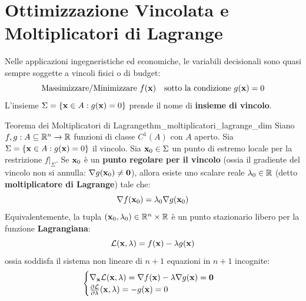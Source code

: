 \section{Ottimizzazione Vincolata e Moltiplicatori di Lagrange}

Nelle applicazioni ingegneristiche ed economiche, le variabili decisionali sono quasi sempre soggette a vincoli fisici o di budget:
\[
\text{Massimizzare/Minimizzare } f(\mathbf{x}) \quad \text{sotto la condizione } g(\mathbf{x}) = 0
\]
L'insieme $\Sigma = \{\mathbf{x} \in A : g(\mathbf{x}) = 0\}$ prende il nome di \textbf{insieme di vincolo}.

\begin{teorema}{Teorema dei Moltiplicatori di Lagrange}{thm_moltiplicatori_lagrange_dim}
Siano $f, g: A \subseteq \mathbb{R}^n \to \mathbb{R}$ funzioni di classe $C^1(A)$ con $A$ aperto. Sia $\Sigma = \{\mathbf{x} \in A : g(\mathbf{x}) = 0\}$ il vincolo.
Sia $\mathbf{x}_0 \in \Sigma$ un punto di estremo locale per la restrizione $\left.f\right|_\Sigma$.
Se $\mathbf{x}_0$ è un \textbf{punto regolare per il vincolo} (ossia il gradiente del vincolo non si annulla: $\nabla g(\mathbf{x}_0) \neq \mathbf{0}$), allora esiste uno scalare reale $\lambda_0 \in \mathbb{R}$ (detto \textbf{moltiplicatore di Lagrange}) tale che:
\[
\nabla f(\mathbf{x}_0) = \lambda_0 \nabla g(\mathbf{x}_0)
\]
Equivalentemente, la tupla $(\mathbf{x}_0, \lambda_0) \in \mathbb{R}^n \times \mathbb{R}$ è un punto stazionario libero per la funzione \textbf{Lagrangiana}:
\[
\mathcal{L}(\mathbf{x}, \lambda) = f(\mathbf{x}) - \lambda g(\mathbf{x})
\]
ossia soddisfa il sistema non lineare di $n+1$ equazioni in $n+1$ incognite:
\[
\begin{cases}
\nabla_{\mathbf{x}} \mathcal{L}(\mathbf{x}, \lambda) = \nabla f(\mathbf{x}) - \lambda \nabla g(\mathbf{x}) = \mathbf{0} \\
\frac{\partial \mathcal{L}}{\partial \lambda}(\mathbf{x}, \lambda) = -g(\mathbf{x}) = 0
\end{cases}
\]
\end{teorema}

